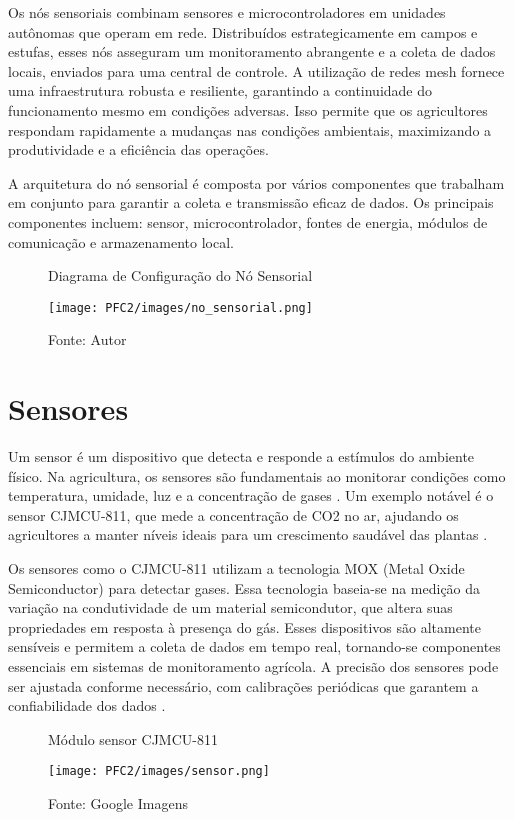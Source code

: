 Os nós sensoriais combinam sensores e microcontroladores em unidades autônomas que operam em rede. Distribuídos estrategicamente em campos e estufas, esses nós asseguram um monitoramento abrangente e a coleta de dados locais, enviados para uma central de controle. A utilização de redes mesh fornece uma infraestrutura robusta e resiliente, garantindo a continuidade do funcionamento mesmo em condições adversas. Isso permite que os agricultores respondam rapidamente a mudanças nas condições ambientais, maximizando a produtividade e a eficiência das operações.

A arquitetura do nó sensorial é composta por vários componentes que trabalham em conjunto para garantir a coleta e transmissão eficaz de dados. Os principais componentes incluem: sensor, microcontrolador, fontes de energia, módulos de comunicação e armazenamento local.


\begin{figure}[H]
    \centering
    \caption{Diagrama de Configuração do Nó Sensorial}
    \texttt{[image: PFC2/images/no\_sensorial.png]}
    \label{fig:diagrama}
    \caption*{Fonte: Autor}
\end{figure}

\section{Sensores} 
Um sensor é um dispositivo que detecta e responde a estímulos do ambiente físico. Na agricultura, os sensores são fundamentais ao monitorar condições como temperatura, umidade, luz e a concentração de gases \cite{weg_sensores_industriais}. Um exemplo notável é o sensor CJMCU-811, que mede a concentração de CO2 no ar, ajudando os agricultores a manter níveis ideais para um crescimento saudável das plantas \cite{sparkfun_ccs811_guide}.

Os sensores como o CJMCU-811 utilizam a tecnologia MOX (Metal Oxide Semiconductor) para detectar gases. Essa tecnologia baseia-se na medição da variação na condutividade de um material semicondutor, que altera suas propriedades em resposta à presença do gás. Esses dispositivos são altamente sensíveis e permitem a coleta de dados em tempo real, tornando-se componentes essenciais em sistemas de monitoramento agrícola. A precisão dos sensores pode ser ajustada conforme necessário, com calibrações periódicas que garantem a confiabilidade dos dados \cite{sparkfun_ccs811_guide}.


\begin{figure}[H]
    \centering
     \caption{Módulo sensor CJMCU-811}
    \texttt{[image: PFC2/images/sensor.png]}
    \label{fig:cjmcu811}

    \caption*{Fonte: Google Imagens}

\end{figure}

